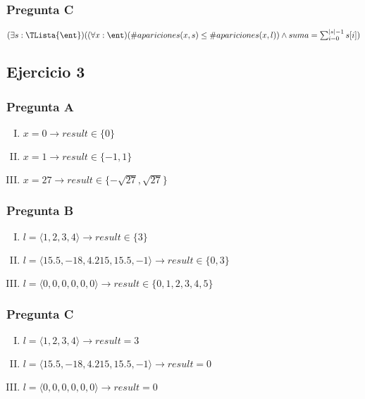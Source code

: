 \subsubsection{Pregunta C}

$(\exists s: \TLista{\ent})( (\forall x: \ent)( \#apariciones(x, s) \leq \#apariciones(x, l) ) \land suma = \sum_{i=0}^{|s|-1} s[i] )$

\subsection{Ejercicio 3}

\subsubsection{Pregunta A}

\begin{enumerate}[I)]
    \item $x = 0 \rightarrow result \in \{ 0 \}$
    \item $x = 1 \rightarrow result \in \{ -1, 1 \}$
    \item $x = 27 \rightarrow result \in \{ -\sqrt{27}, \sqrt{27} \}$
\end{enumerate}

\subsubsection{Pregunta B}

\begin{enumerate}[I)]
    \item $l = \langle 1, 2, 3, 4 \rangle \rightarrow result \in \{ 3 \}$
    \item $l = \langle 15.5, -18, 4.215, 15.5, -1 \rangle \rightarrow result \in \{ 0, 3 \}$
    \item $l = \langle 0, 0, 0, 0, 0, 0 \rangle \rightarrow result \in \{ 0, 1, 2, 3, 4, 5 \}$
\end{enumerate}

\subsubsection{Pregunta C}

\begin{enumerate}[I)]
    \item $l = \langle 1, 2, 3, 4 \rangle \rightarrow result = 3$
    \item $l = \langle 15.5, -18, 4.215, 15.5, -1 \rangle \rightarrow result = 0$
    \item $l = \langle 0, 0, 0, 0, 0, 0 \rangle \rightarrow result = 0$
\end{enumerate}


